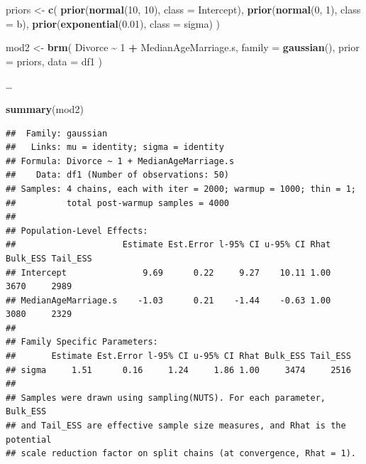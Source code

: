 \documentclass[
  a4paper,11pt,twoside,onecolumn,openright,final,oldfontcommands]{memoir}
\newenvironment{Shaded}{\begin{snugshade}}{\end{snugshade}}
\newcommand{\DataTypeTok}[1]{\textcolor[rgb]{0.13,0.29,0.53}{#1}}
\newcommand{\DecValTok}[1]{\textcolor[rgb]{0.00,0.00,0.81}{#1}}
\newcommand{\FloatTok}[1]{\textcolor[rgb]{0.00,0.00,0.81}{#1}}
\newcommand{\KeywordTok}[1]{\textcolor[rgb]{0.13,0.29,0.53}{\textbf{#1}}}
\newcommand{\NormalTok}[1]{#1}
\newcommand{\OperatorTok}[1]{\textcolor[rgb]{0.81,0.36,0.00}{\textbf{#1}}}
\newcommand{\StringTok}[1]{\textcolor[rgb]{0.31,0.60,0.02}{#1}}
\theoremstyle{definition}
\theoremstyle{definition}
\theoremstyle{definition}
\theoremstyle{remark}
\begin{document}
\begin{Shaded}
\begin{Highlighting}[]
\NormalTok{priors \textless{}{-}}\StringTok{ }\KeywordTok{c}\NormalTok{(}
  \KeywordTok{prior}\NormalTok{(}\KeywordTok{normal}\NormalTok{(}\DecValTok{10}\NormalTok{, }\DecValTok{10}\NormalTok{), }\DataTypeTok{class =}\NormalTok{ Intercept),}
  \KeywordTok{prior}\NormalTok{(}\KeywordTok{normal}\NormalTok{(}\DecValTok{0}\NormalTok{, }\DecValTok{1}\NormalTok{), }\DataTypeTok{class =}\NormalTok{ b),}
  \KeywordTok{prior}\NormalTok{(}\KeywordTok{exponential}\NormalTok{(}\FloatTok{0.01}\NormalTok{), }\DataTypeTok{class =}\NormalTok{ sigma)}
\NormalTok{  )}

\NormalTok{mod2 \textless{}{-}}\StringTok{ }\KeywordTok{brm}\NormalTok{(}
\NormalTok{  Divorce }\OperatorTok{\textasciitilde{}}\StringTok{ }\DecValTok{1} \OperatorTok{+}\StringTok{ }\NormalTok{MedianAgeMarriage.s,}
  \DataTypeTok{family =} \KeywordTok{gaussian}\NormalTok{(),}
  \DataTypeTok{prior =}\NormalTok{ priors,}
  \DataTypeTok{data =}\NormalTok{ df1}
\NormalTok{  )}
\end{Highlighting}
\end{Shaded}

\ldots{}

\begin{Shaded}
\begin{Highlighting}[]
\KeywordTok{summary}\NormalTok{(mod2)}
\end{Highlighting}
\end{Shaded}

\begin{verbatim}
##  Family: gaussian 
##   Links: mu = identity; sigma = identity 
## Formula: Divorce ~ 1 + MedianAgeMarriage.s 
##    Data: df1 (Number of observations: 50) 
## Samples: 4 chains, each with iter = 2000; warmup = 1000; thin = 1;
##          total post-warmup samples = 4000
## 
## Population-Level Effects: 
##                     Estimate Est.Error l-95% CI u-95% CI Rhat Bulk_ESS Tail_ESS
## Intercept               9.69      0.22     9.27    10.11 1.00     3670     2989
## MedianAgeMarriage.s    -1.03      0.21    -1.44    -0.63 1.00     3080     2329
## 
## Family Specific Parameters: 
##       Estimate Est.Error l-95% CI u-95% CI Rhat Bulk_ESS Tail_ESS
## sigma     1.51      0.16     1.24     1.86 1.00     3474     2516
## 
## Samples were drawn using sampling(NUTS). For each parameter, Bulk_ESS
## and Tail_ESS are effective sample size measures, and Rhat is the potential
## scale reduction factor on split chains (at convergence, Rhat = 1).
\end{verbatim}
\end{document}
